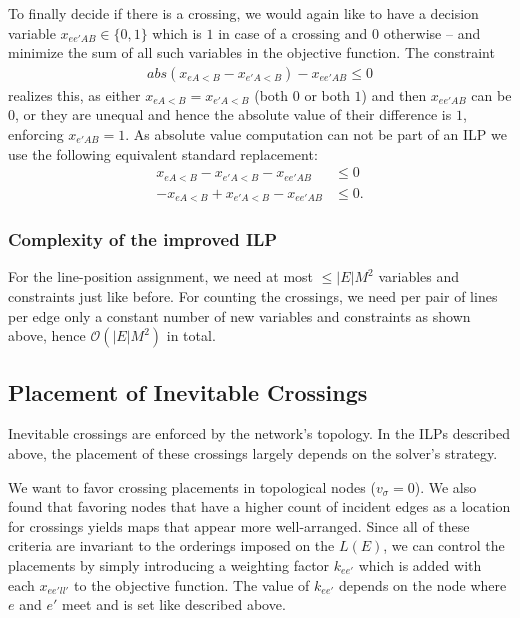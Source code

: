 \documentclass{llncs}
\begin{document}
To finally decide if there is a crossing, we would again like to have a decision variable $x_{ee'AB} \in \{0,1\}$ which is $1$ in case of a crossing and $0$ otherwise -- and minimize the sum of all such variables in the objective function.
The constraint
\begin{gather}
	abs(x_{eA<B}-x_{e'A<B}) - x_{ee'AB} \leq 0
\end{gather}
realizes this, as either $x_{eA<B} = x_{e'A<B}$ (both $0$ or both $1$) and then $x_{ee'AB}$ can be $0$, or they are unequal and hence the absolute value of their difference is $1$, enforcing $x_{e'AB}=1$. As absolute value computation can not be part of an ILP we use the following equivalent standard replacement:
\begin{align}
	x_{eA<B} - x_{e'A<B} - x_{ee'AB} &\leq 0 \label{EQ:abs_upper}\\
	-x_{eA<B} + x_{e'A<B} - x_{ee'AB} &\leq 0. \label{EQ:abs_lower}
\end{align}

\subsubsection{Complexity of the improved ILP}
For the line-position assignment, we need at most $\leq |E|M^{2}$ variables and constraints just like before. For counting the  crossings, we need per pair of lines per edge only a constant number of new variables and constraints as shown above, hence $\mathcal{O}(|E|M^{2})$ in total.

\subsection{Placement of Inevitable Crossings}\label{SEC:crossing_placement}

Inevitable crossings are enforced by the network's topology. In the ILPs described above, the placement of these crossings largely depends on the solver's strategy.

We want to favor crossing placements in topological nodes ($v_\sigma = 0$). We also found that favoring nodes that have a higher count of incident edges as a location for crossings yields maps that appear more well-arranged.
Since all of these criteria are invariant to the orderings imposed on the $L(E)$, we can control the placements by simply introducing a weighting factor $k_{ee'}$ which is added with each $x_{ee'll'}$ to the objective function.
The value of $k_{ee'}$ depends on the node where $e$ and $e'$ meet and is set like described above.
\end{document}
